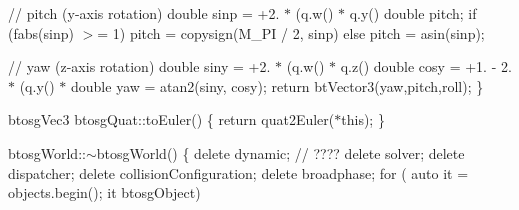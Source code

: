\begin{DoxyCompactItemize}
    // pitch (y-\/axis rotation)
    double sinp = +2. $\ast$ (q.\+w() $\ast$ q.\+y() 
    double pitch;
    if (fabs(sinp) $>$= 1)
        pitch = copysign(\+M\+\_\+\+P\+I / 2, sinp)
    else
        pitch = asin(sinp);

    // yaw (z-\/axis rotation)
    double siny = +2. $\ast$ (q.\+w() $\ast$ q.\+z() 
    double cosy = +1. -\/ 2. $\ast$ (q.\+y() $\ast$ 
    double yaw = atan2(siny, cosy);
    return bt\+Vector3(yaw,pitch,roll);
\}

btosg\+Vec3 btosg\+Quat\+::to\+Euler()
\{
    return quat2\+Euler($\ast$this);
\}


btosg\+World\+::$\sim$btosg\+World() \{
    delete dynamic; // ????
    delete solver;
    delete dispatcher;
    delete collision\+Configuration;
    delete broadphase;
    for ( auto it = objects.\+begin(); it 
        btosg\+Object)\end{DoxyCompactItemize}
